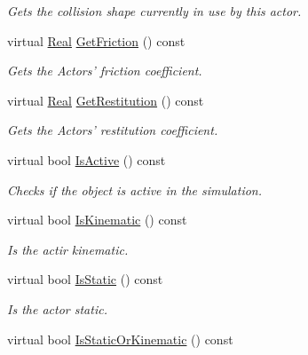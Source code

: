 \begin{DoxyCompactItemize}
\begin{DoxyCompactList}\small\item\em Gets the collision shape currently in use by this actor. \item\end{DoxyCompactList}\item 
virtual \hyperlink{namespacephys_af7eb897198d265b8e868f45240230d5f}{Real} \hyperlink{classphys_1_1ActorBasePhysicsSettings_ad38f4ccdbc0ecf997bb9745c23961f6d}{GetFriction} () const 
\begin{DoxyCompactList}\small\item\em Gets the Actors' friction coefficient. \item\end{DoxyCompactList}\item 
virtual \hyperlink{namespacephys_af7eb897198d265b8e868f45240230d5f}{Real} \hyperlink{classphys_1_1ActorBasePhysicsSettings_a937e66bb0293c4162fae48d9e37196f4}{GetRestitution} () const 
\begin{DoxyCompactList}\small\item\em Gets the Actors' restitution coefficient. \item\end{DoxyCompactList}\item 
virtual bool \hyperlink{classphys_1_1ActorBasePhysicsSettings_aeb966cf55b9b626897731f42b5a2fc64}{IsActive} () const 
\begin{DoxyCompactList}\small\item\em Checks if the object is active in the simulation. \item\end{DoxyCompactList}\item 
virtual bool \hyperlink{classphys_1_1ActorBasePhysicsSettings_a8128bcfc407909a57026eb38812b1d1d}{IsKinematic} () const 
\begin{DoxyCompactList}\small\item\em Is the actir kinematic. \item\end{DoxyCompactList}\item 
virtual bool \hyperlink{classphys_1_1ActorBasePhysicsSettings_a68c32cbe7329e138c5ea11c5b098483f}{IsStatic} () const 
\begin{DoxyCompactList}\small\item\em Is the actor static. \item\end{DoxyCompactList}\item 
virtual bool \hyperlink{classphys_1_1ActorBasePhysicsSettings_a5fe007187584b836ada963f8a23eb377}{IsStaticOrKinematic} () const 

\end{DoxyCompactItemize}
